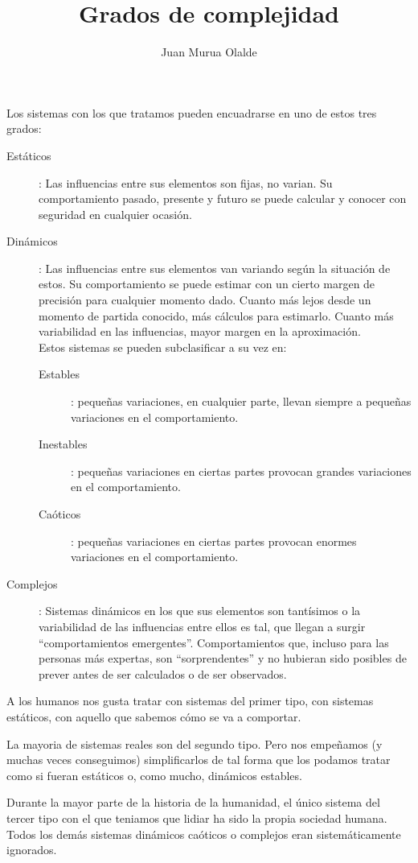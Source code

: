 \documentclass[10pt,a4paper]{article}
\author{Juan Murua Olalde}
\title{Grados de complejidad}
\begin{document}
Los sistemas con los que tratamos pueden encuadrarse en uno de estos tres grados:
\begin{description}

\item[Estáticos]: Las influencias entre sus elementos son fijas, no varian. Su comportamiento pasado, presente y futuro se puede calcular y conocer con seguridad en cualquier ocasión.

\item[Dinámicos]: Las influencias entre sus elementos van variando según la situación de estos. Su comportamiento se puede estimar con un cierto margen de precisión para cualquier momento dado. Cuanto más lejos desde un momento de partida conocido, más cálculos para estimarlo. Cuanto más variabilidad en las influencias, mayor margen en la aproximación.
\\Estos sistemas se pueden subclasificar a su vez en:
\begin{description}
\item[Estables]: pequeñas variaciones, en cualquier parte, llevan siempre a pequeñas variaciones en el comportamiento.
\item[Inestables]: pequeñas variaciones en ciertas partes provocan grandes variaciones en el comportamiento.
\item[Caóticos]: pequeñas variaciones en ciertas partes provocan enormes variaciones en el comportamiento.
\end{description}

\item[Complejos]: Sistemas dinámicos en los que sus elementos son tantísimos o la variabilidad de las influencias entre ellos es tal, que llegan a surgir ``comportamientos emergentes''. Comportamientos que, incluso para las personas más expertas, son ``sorprendentes'' y no hubieran sido posibles de prever antes de ser calculados o de ser observados.

\end{description}

A los humanos nos gusta tratar con sistemas del primer tipo, con sistemas estáticos, con aquello que sabemos cómo se va a comportar.

La mayoria de sistemas reales son del segundo tipo. Pero nos empeñamos (y muchas veces conseguimos) simplificarlos de tal forma que los podamos tratar como si fueran estáticos o, como mucho, dinámicos estables.

Durante la mayor parte de la historia de la humanidad, el único sistema del tercer tipo con el que teniamos que lidiar ha sido la propia sociedad humana. Todos los demás sistemas dinámicos caóticos o complejos eran sistemáticamente ignorados.
\end{document}
